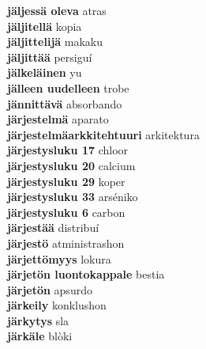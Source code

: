 \textbf{ jäljessä oleva  } atras \\
\textbf{ jäljitellä  } kopia \\
\textbf{ jäljittelijä  } makaku \\
\textbf{ jäljittää  } persiguí \\
\textbf{ jälkeläinen  } yu \\
\textbf{ jälleen uudelleen  } trobe \\
\textbf{ jännittävä  } absorbando \\
\textbf{ järjestelmä  } aparato \\
\textbf{ järjestelmäarkkitehtuuri  } arkitektura \\
\textbf{ järjestysluku 17  } chloor \\
\textbf{ järjestysluku 20  } calcium \\
\textbf{ järjestysluku 29  } koper \\
\textbf{ järjestysluku 33  } arséniko \\
\textbf{ järjestysluku 6  } carbon \\
\textbf{ järjestää  } distribuí \\
\textbf{ järjestö  } atministrashon \\
\textbf{ järjettömyys  } lokura \\
\textbf{ järjetön luontokappale  } bestia \\
\textbf{ järjetön  } apsurdo \\
\textbf{ järkeily  } konklushon \\
\textbf{ järkytys  } sla \\
\textbf{ järkäle  } blòki \\
